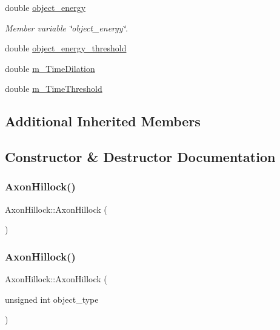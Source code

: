 \begin{DoxyCompactItemize}
double \mbox{\hyperlink{classAxonHillock_a1ca9726d785ecc1dce0ac01933cf1dca}{object\+\_\+energy}}
\begin{DoxyCompactList}\small\item\em Member variable \char`\"{}object\+\_\+energy\char`\"{}. \end{DoxyCompactList}\item 
double \mbox{\hyperlink{classAxonHillock_a1fc144064d284978f785b1534a290d86}{object\+\_\+energy\+\_\+threshold}}
\item 
double \mbox{\hyperlink{classAxonHillock_ad3b4b4553315421c5a22f37dd94e2e94}{m\+\_\+\+Time\+Dilation}}
\item 
double \mbox{\hyperlink{classAxonHillock_acb8b1407116e6656c49e89c3a82bfd7c}{m\+\_\+\+Time\+Threshold}}
\end{DoxyCompactItemize}
\subsection*{Additional Inherited Members}


\subsection{Constructor \& Destructor Documentation}
\mbox{\label{classAxonHillock_a432095dfb25ece393cdd83b5eb4f097a}} 
\subsubsection{\texorpdfstring{Axon\+Hillock()}{AxonHillock()}\hspace{0.1cm}{\footnotesize\ttfamily [1/4]}}
{\footnotesize\ttfamily Axon\+Hillock\+::\+Axon\+Hillock (\begin{DoxyParamCaption}{ }\end{DoxyParamCaption})\hspace{0.3cm}{\ttfamily [inline]}}

\mbox{\label{classAxonHillock_a20a4da0885f32bfca34ab5cda2a13562}} 
\subsubsection{\texorpdfstring{Axon\+Hillock()}{AxonHillock()}\hspace{0.1cm}{\footnotesize\ttfamily [2/4]}}
{\footnotesize\ttfamily Axon\+Hillock\+::\+Axon\+Hillock (\begin{DoxyParamCaption}\item[{unsigned int}]{object\+\_\+type }\end{DoxyParamCaption})\hspace{0.3cm}{\ttfamily [inline]}}

